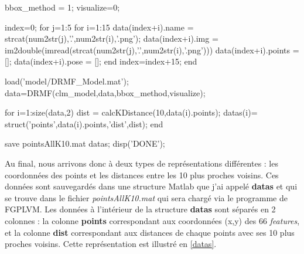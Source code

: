 \documentclass[poster]{polytech/polytech}
\begin{document}
\begin{matlabsource}
\label{codeDetection}
bbox_method = 1; %
visualize=0; %

index=0; %
for j=1:5 %
    for i=1:15 %
        data(index+i).name = strcat(num2str(j),'.',num2str(i),'.png');%
        data(index+i).img = im2double(imread(strcat(num2str(j),'.',num2str(i),'.png')))%
        data(index+i).points = []; %
        data(index+i).pose = []; %
    end
    index=index+15; %
end

load('model/DRMF_Model.mat'); %
data=DRMF(clm_model,data,bbox_method,visualize); %
    
for i=1:size(data,2) %
    dist = calcKDistance(10,data(i).points); %
    datas(i)= struct('points',data(i).points,'dist',dist); %
end

save pointsAllK10.mat datas; %
disp('DONE');
\end{matlabsource}

Au final, nous arrivons donc à deux types de représentations différentes : les coordonnées des points et les distances entre les 10 plus proches voisins. Ces données sont sauvegardés dans une structure Matlab que j'ai appelé \textbf{datas} et qui se trouve dans le fichier \textit{pointsAllK10.mat} qui sera chargé via le programme de FGPLVM. Les données à l'intérieur de la structure \textbf{datas} sont séparés en 2 colonnes :  la colonne \textbf{points} correspondant aux coordonnées (x,y) des 66 \textit{features}, et la colonne \textbf{dist} correspondant aux distances de chaque points avec ses 10 plus proches voisins. Cette représentation est illustré en \autoref{datas}.\\
\end{document}
